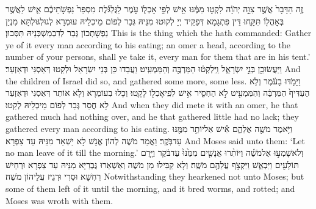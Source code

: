 {זֶ֤ה הַדָּבָר֙ אֲשֶׁ֣ר צִוָּ֣ה יְהֹוָ֔ה לִקְט֣וּ מִמֶּ֔נּוּ אִ֖ישׁ לְפִ֣י אׇכְל֑וֹ עֹ֣מֶר לַגֻּלְגֹּ֗לֶת מִסְפַּר֙ נַפְשֹׁ֣תֵיכֶ֔ם אִ֛ישׁ לַאֲשֶׁ֥ר בְּאׇהֳל֖וֹ תִּקָּֽחוּ׃}
{דֵּין פִּתְגָמָא דְּפַקֵּיד יְיָ לְקוּטוּ מִנֵּיהּ גְּבַר לְפוֹם מֵיכְלֵיהּ עוּמְרָא לְגוּלְגּוּלְתָּא מִנְיַן נַפְשָׁתְכוֹן גְּבַר לְדִבְמַשְׁכְּנֵיהּ תִּסְּבוּן׃}
{This is the thing which the \lord\space hath commanded: Gather ye of it every man according to his eating; an omer a head, according to the number of your persons, shall ye take it, every man for them that are in his tent.’}{}
{וַיַּעֲשׂוּ\maqqaf כֵ֖ן בְּנֵ֣י יִשְׂרָאֵ֑ל וַֽיִּלְקְט֔וּ הַמַּרְבֶּ֖ה וְהַמַּמְעִֽיט׃}
{וַעֲבַדוּ כֵּן בְּנֵי יִשְׂרָאֵל וּלְקַטוּ דְּאַסְגִּי וּדְאַזְעַר׃}
{And the children of Israel did so, and gathered some more, some less.}{}
{וַיָּמֹ֣דּוּ בָעֹ֔מֶר וְלֹ֤א הֶעְדִּיף֙ הַמַּרְבֶּ֔ה וְהַמַּמְעִ֖יט לֹ֣א הֶחְסִ֑יר אִ֥ישׁ לְפִֽי\maqqaf אׇכְל֖וֹ לָקָֽטוּ׃}
{וְכָלוּ בְעוֹמְרָא וְלָא אוֹתַר דְּאַסְגִּי וּדְאַזְעַר לָא חֲסַר גְּבַר לְפוֹם מֵיכְלֵיהּ לְקַטוּ׃}
{And when they did mete it with an omer, he that gathered much had nothing over, and he that gathered little had no lack; they gathered every man according to his eating.}{}
{וַיֹּ֥אמֶר מֹשֶׁ֖ה אֲלֵהֶ֑ם אִ֕ישׁ אַל\maqqaf יוֹתֵ֥ר מִמֶּ֖נּוּ עַד\maqqaf בֹּֽקֶר׃}
{וַאֲמַר מֹשֶׁה לְהוֹן אֱנָשׁ לָא יַשְׁאַר מִנֵּיהּ עַד צַפְרָא׃}
{And Moses said unto them: ‘Let no man leave of it till the morning.’}{}
{וְלֹא\maqqaf שָׁמְע֣וּ אֶל\maqqaf מֹשֶׁ֗ה וַיּוֹתִ֨רוּ אֲנָשִׁ֤ים מִמֶּ֙נּוּ֙ עַד\maqqaf בֹּ֔קֶר וַיָּ֥רֻם תּוֹלָעִ֖ים וַיִּבְאַ֑שׁ וַיִּקְצֹ֥ף עֲלֵהֶ֖ם מֹשֶֽׁה׃}
{וְלָא קַבִּילוּ מִן מֹשֶׁה וְאַשְׁאַרוּ גֻּבְרַיָּא מִנֵּיהּ עַד צַפְרָא וּרְחֵישׁ רִחְשָׁא וּסְרִי וּרְגֵיז עֲלֵיהוֹן מֹשֶׁה׃}
{Notwithstanding they hearkened not unto Moses; but some of them left of it until the morning, and it bred worms, and rotted; and Moses was wroth with them.}{}
